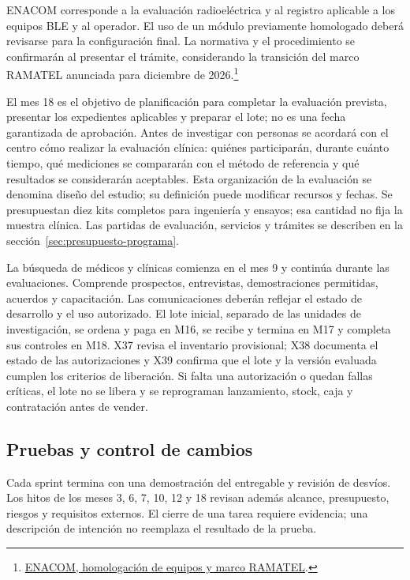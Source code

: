 ENACOM corresponde a la evaluación radioeléctrica y al registro aplicable a los equipos BLE y al operador. El uso de un módulo previamente homologado deberá revisarse para la configuración final. La normativa y el procedimiento se confirmarán al presentar el trámite, considerando la transición del marco RAMATEL anunciada para diciembre de 2026.\footnote{\href{https://enacom.gob.ar/m/homologacion-de-equipos_p347}{ENACOM, homologación de equipos y marco RAMATEL}.}

El mes 18 es el objetivo de planificación para completar la evaluación prevista, presentar los expedientes aplicables y preparar el lote; no es una fecha garantizada de aprobación. Antes de investigar con personas se acordará con el centro cómo realizar la evaluación clínica: quiénes participarán, durante cuánto tiempo, qué mediciones se compararán con el método de referencia y qué resultados se considerarán aceptables. Esta organización de la evaluación se denomina diseño del estudio; su definición puede modificar recursos y fechas. Se presupuestan diez kits completos para ingeniería y ensayos; esa cantidad no fija la muestra clínica. Las partidas de evaluación, servicios y trámites se describen en la sección~\ref{sec:presupuesto-programa}.

La búsqueda de médicos y clínicas comienza en el mes 9 y continúa durante las evaluaciones. Comprende prospectos, entrevistas, demostraciones permitidas, acuerdos y capacitación. Las comunicaciones deberán reflejar el estado de desarrollo y el uso autorizado. El lote inicial, separado de las unidades de investigación, se ordena y paga en M16, se recibe y termina en M17 y completa sus controles en M18. X37 revisa el inventario provisional; X38 documenta el estado de las autorizaciones y X39 confirma que el lote y la versión evaluada cumplen los criterios de liberación. Si falta una autorización o quedan fallas críticas, el lote no se libera y se reprograman lanzamiento, stock, caja y contratación antes de vender.

\subsection{Pruebas y control de cambios}
Cada sprint termina con una demostración del entregable y revisión de desvíos. Los hitos de los meses 3, 6, 7, 10, 12 y 18 revisan además alcance, presupuesto, riesgos y requisitos externos. El cierre de una tarea requiere evidencia; una descripción de intención no reemplaza el resultado de la prueba.

